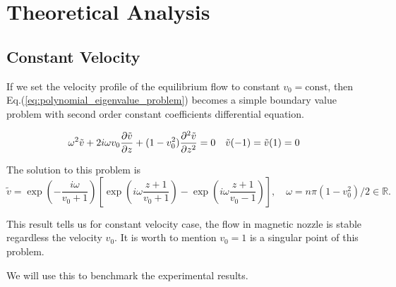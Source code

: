 \chapter{Theoretical Analysis} \label{chap:theoretical_analysis}
\section{Constant Velocity}
If we set the velocity profile of the equilibrium flow to constant $v_0=\text{const}$, then Eq.(\ref{eq:polynomial_eigenvalue_problem}) becomes a simple boundary value problem with second order constant coefficients differential equation.

\begin{equation} \label{eq:constant_v_problem_dirichlet}
    \omega^2\tilde{v} + 2i\omega v_0\pdv{\tilde{v}}{z} + (1-v_0^2)\pdv[2]{\tilde{v}}{z} = 0
    \quad
    \tilde{v}(-1) = \tilde{v}(1) = 0
\end{equation}

The solution to this problem is
\begin{equation} \label{eq:constant_v_solution_dirichlet}
    \tilde{v} = \exp\left(-\frac{i\omega}{v_0+1}\right)
\left[ \exp\left(i\omega\frac{z+1}{v_0+1}\right) - \exp\left(i\omega\frac{z+1}{v_0-1}\right) \right], \quad \omega=n\pi(1-v_0^2)/2 \in \mathbb{R}.
\end{equation}

This result tells us for constant velocity case, the flow in magnetic nozzle is stable regardless the velocity $v_0$. It is worth to mention $v_0=1$ is a singular point of this problem.

We will use this to benchmark the experimental results. 

